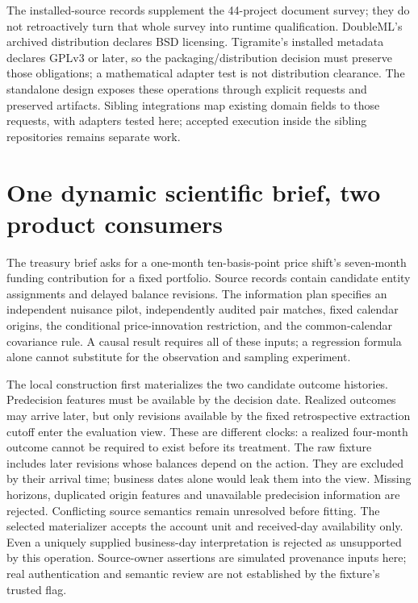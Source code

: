 The installed-source records supplement the 44-project document survey;
they do not retroactively turn that whole survey into runtime qualification.
DoubleML's archived distribution declares BSD licensing. Tigramite's
installed metadata declares GPLv3 or later, so the packaging/distribution
decision must preserve those obligations; a mathematical adapter test is
not distribution clearance. The standalone design exposes these operations
through explicit requests and preserved artifacts. Sibling integrations
map existing domain fields to those requests, with adapters tested here;
accepted execution inside the sibling repositories remains separate work.


\section{One dynamic scientific brief, two product consumers}
\label{s6:composition}
The treasury brief asks for a one-month ten-basis-point price shift's
seven-month funding contribution for a fixed portfolio. Source records
contain candidate entity assignments and delayed balance revisions.
The information plan specifies an independent nuisance pilot, independently
audited pair matches, fixed calendar origins, the conditional price-innovation
restriction, and the common-calendar covariance rule. A causal result
requires all of these inputs; a regression formula alone cannot substitute
for the observation and sampling experiment.

The local construction first materializes the two candidate outcome
histories. Predecision features must be available by the decision date.
Realized outcomes may arrive later, but only revisions available by the
fixed retrospective extraction cutoff enter the evaluation view. These
are different clocks: a realized four-month outcome cannot be required to
exist before its treatment. The raw fixture includes later revisions whose
balances depend on the action. They are excluded by their arrival time;
business dates alone would leak them into the view. Missing horizons,
duplicated origin features and unavailable predecision information are
rejected. Conflicting source semantics remain unresolved before fitting.
The selected materializer accepts the account unit and received-day
availability only. Even a uniquely supplied business-day interpretation is
rejected as unsupported by this operation. Source-owner assertions are
simulated provenance inputs here; real authentication and semantic review
are not established by the fixture's trusted flag.

